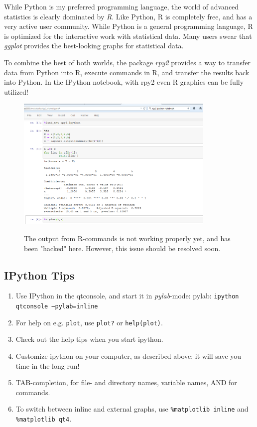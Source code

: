 While Python is my preferred programming language, the world of advanced statistics is clearly dominated by \emph{R}. Like Python, R is completely free, and has a very active user community. While Python is a general programming language, R is optimized for the interactive work with statistical data. Many users swear that \emph{ggplot} provides the best-looking graphs for statistical data.

To combine the best of both worlds, the package \emph{rpy2} provides a way to transfer data from Python into R, execute commands in R, and transfer the results back into Python. In the IPython notebook, with rpy2 even R graphics can be fully utilized!

\begin{figure}
  \centering
  \includegraphics[width=0.85\textwidth]{../Images/ipython-rmagic.png}\\
  \caption{The output from R-commands is not working properly yet, and has been "hacked" here. However, this issue should be resolved soon.}
\end{figure}

\subsection{IPython Tips}

\begin{enumerate}
    \item Use IPython in the qtconsole, and start it in \emph{pylab}-mode: pylab: \texttt{ipython qtconsole ---pylab=inline}
    \item For help on e.g. \texttt{plot}, use \texttt{plot?} or \texttt{help(plot)}.
    \item Check out the help tips when you start ipython.
    \item Customize ipython on your computer, as described above: it will save you time in the long run!
    \item TAB-completion, for file- and directory names, variable names, AND for commands.
    \item To switch between inline and external graphs, use \; \texttt{\%matplotlib inline} and \; \texttt{\%matplotlib qt4}.
\end{enumerate}

